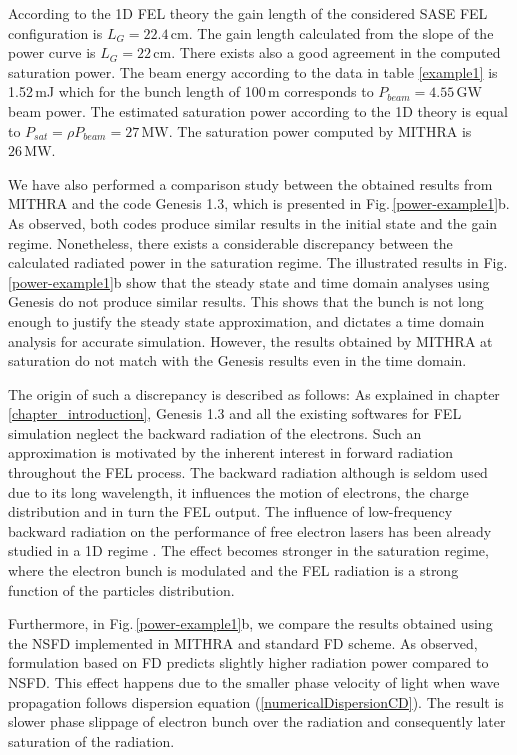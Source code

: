 According to the 1D FEL theory the gain length of the considered SASE FEL configuration is $L_G=22.4\,\mathrm{cm}$.
%
The gain length calculated from the slope of the power curve is $L_G=22\,\mathrm{cm}$.
%
There exists also a good agreement in the computed saturation power.
%
The beam energy according to the data in table \ref{example1} is 1.52\,mJ which for the bunch length of 100\,{\textmu}m corresponds to $P_{beam}=4.55\,\mathrm{GW}$ beam power.
%
The estimated saturation power according to the 1D theory is equal to $P_{sat} = \rho P_{beam} = 27\,\mathrm{MW}$.
%
The saturation power computed by MITHRA is $26\,\mathrm{MW}$.

We have also performed a comparison study between the obtained results from MITHRA and the code Genesis 1.3, which is presented in Fig.\,\ref{power-example1}b.
%
As observed, both codes produce similar results in the initial state and the gain regime.
%
Nonetheless, there exists a considerable discrepancy between the calculated radiated power in the saturation regime.
%
The illustrated results in Fig.\,\ref{power-example1}b show that the steady state and time domain analyses using Genesis do not produce similar results.
%
This shows that the bunch is not long enough to justify the steady state approximation, and dictates a time domain analysis for accurate simulation.
%
However, the results obtained by MITHRA at saturation do not match with the Genesis results even in the time domain.

The origin of such a discrepancy is described as follows:
%
As explained in chapter \ref{chapter_introduction}, Genesis 1.3 and all the existing softwares for FEL simulation neglect the backward radiation of the electrons.
%
Such an approximation is motivated by the inherent interest in forward radiation throughout the FEL process.
%
The backward radiation although is seldom used due to its long wavelength, it influences the motion of electrons, the charge distribution and in turn the FEL output.
%
The influence of low-frequency backward radiation on the performance of free electron lasers has been already studied in a 1D regime \cite{maroli2000effects}.
%
The effect becomes stronger in the saturation regime, where the electron bunch is modulated and the FEL radiation is a strong function of the particles distribution.

Furthermore, in Fig.\,\ref{power-example1}b, we compare the results obtained using the NSFD implemented in MITHRA and standard FD scheme.
%
As observed, formulation based on FD predicts slightly higher radiation power compared to NSFD.
%
This effect happens due to the smaller phase velocity of light when wave propagation follows dispersion equation (\ref{numericalDispersionCD}).
%
The result is slower phase slippage of electron bunch over the radiation and consequently later saturation of the radiation.

